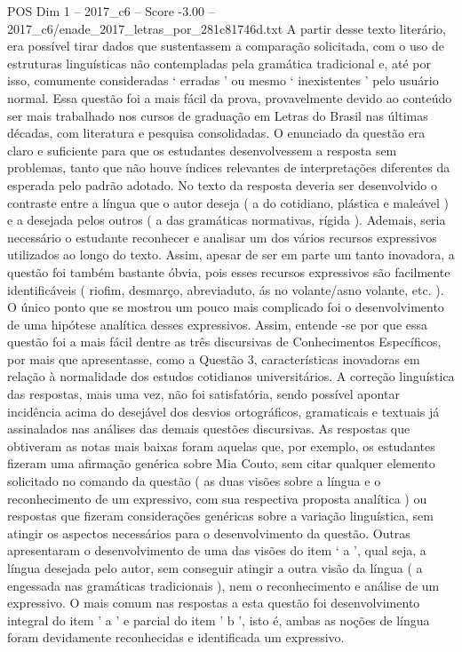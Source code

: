 \begin{textsample}{POS Dim 1 – 2017\_c6 – Score -3.00 – 2017\_c6/enade\_2017\_letras\_por\_281c81746d.txt}
A partir desse texto literário, era possível tirar dados que sustentassem a comparação solicitada, com o uso de estruturas linguísticas não contempladas pela gramática tradicional e, até por isso, comumente consideradas ‘ erradas ’ ou mesmo ‘ inexistentes ’ pelo usuário normal.
Essa questão foi a mais fácil da prova, provavelmente devido ao conteúdo ser mais trabalhado nos cursos de graduação em Letras do Brasil nas últimas décadas, com literatura e pesquisa consolidadas.
O enunciado da questão era claro e suficiente para que os estudantes desenvolvessem a resposta sem problemas, tanto que não houve índices relevantes de interpretações diferentes da esperada pelo padrão adotado.
No texto da resposta deveria ser desenvolvido o contraste entre a língua que o autor deseja ( a do cotidiano, plástica e maleável ) e a desejada pelos outros ( a das gramáticas normativas, rígida ).
Ademais, seria necessário o estudante reconhecer e analisar um dos vários recursos expressivos utilizados ao longo do texto.
Assim, apesar de ser em parte um tanto inovadora, a questão foi também bastante óbvia, pois esses recursos expressivos são facilmente identificáveis ( riofim, desmarço, abreviaduto, ás no volante/asno volante, etc. ).
O único ponto que se mostrou um pouco mais complicado foi o desenvolvimento de uma hipótese analítica desses expressivos.
Assim, entende -se por que essa questão foi a mais fácil dentre as três discursivas de Conhecimentos Específicos, por mais que apresentasse, como a Questão 3, características inovadoras em relação à normalidade dos estudos cotidianos universitários.
A correção linguística das respostas, mais uma vez, não foi satisfatória, sendo possível apontar incidência acima do desejável dos desvios ortográficos, gramaticais e textuais já assinalados nas análises das demais questões discursivas.
As respostas que obtiveram as notas mais baixas foram aquelas que, por exemplo, os estudantes fizeram uma afirmação genérica sobre Mia Couto, sem citar qualquer elemento solicitado no comando da questão ( as duas visões sobre a língua e o reconhecimento de um expressivo, com sua respectiva proposta analítica ) ou respostas que fizeram considerações genéricas sobre a variação linguística, sem atingir os aspectos necessários para o desenvolvimento da questão.
Outras apresentaram o desenvolvimento de uma das visões do item ‘ a ’, qual seja, a língua desejada pelo autor, sem conseguir atingir a outra visão da língua ( a engessada nas gramáticas tradicionais ), nem o reconhecimento e análise de um expressivo.
O mais comum nas respostas a esta questão foi desenvolvimento integral do item ' a ' e parcial do item ' b ', isto é, ambas as noções de língua foram devidamente reconhecidas e identificada um expressivo.

\end{textsample}
